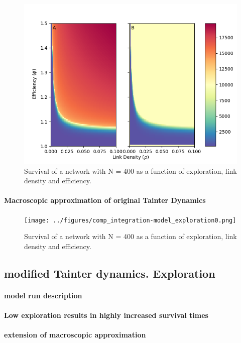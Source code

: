 \begin{figure}[htb]
    \centering
    \includegraphics[width = \linewidth]{../figures/parscan_base0.png}
    \caption{Survival of a network with N = 400 as a function of exploration, link density and efficiency.}
    \label{fig:survival}
\end{figure}



\paragraph{Macroscopic approximation of original Tainter Dynamics}

\begin{figure}[htb]
    \centering
    \texttt{[image: ../figures/comp\_integration-model\_exploration0.png]}
    \caption{Survival of a network with N = 400 as a function of exploration, link density and efficiency.}
    \label{fig:survival}
\end{figure}


\subsection{modified Tainter dynamics. Exploration}

\paragraph{model run description}

\paragraph{Low exploration results in highly increased survival times}

\paragraph{extension of macroscopic approximation}
